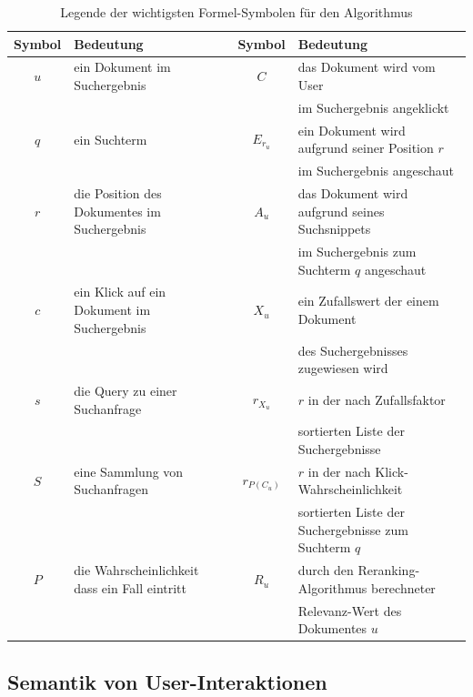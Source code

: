 \begin{table}[H]
\centering
\vspace{-.5em}
\caption[Legende der wichtigsten Formel-Symbolen für den Algorithmus]{Legende der wichtigsten Formel-Symbolen für den Algorithmus}
\label{tab:LegendeSymboleFormelnAlgorithmus}
\vspace{-.5em}
\footnotesize
\renewcommand*{\arraystretch}{1.2}
\begin{tabular}{clcl} \hline
\textbf{Symbol} & \textbf{Bedeutung} & \textbf{Symbol} & \textbf{Bedeutung} \\ \hline
$u$	& ein Dokument im Suchergebnis & $C$	& das Dokument wird vom User \\ &&& im Suchergebnis angeklickt \\ 
$q$	& ein Suchterm & $E_{r_{u}}$	& ein Dokument wird aufgrund seiner Position $r$ \\ &&& im Suchergebnis angeschaut \\
$r$	& die Position des Dokumentes im Suchergebnis &  $A_{u}$	& das Dokument wird aufgrund seines Suchsnippets \\ &&& im Suchergebnis zum Suchterm $q$ angeschaut \\ 
$c$	& ein Klick auf ein Dokument im Suchergebnis & $X_{u}$	& ein Zufallswert der einem Dokument \\ &&& des Suchergebnisses zugewiesen wird \\
$s$ 	& die Query zu einer Suchanfrage & $r_{X_{u}}$	& $r$ in der nach Zufallsfaktor \\ &&& sortierten Liste der Suchergebnisse \\ 
$S$	& eine Sammlung von Suchanfragen & $r_{P(C_{u})}$ 	& $r$ in der nach Klick-Wahrscheinlichkeit \\ &&& sortierten Liste der Suchergebnisse zum Suchterm $q$\\
$P$	& die Wahrscheinlichkeit dass ein Fall eintritt &  $R_{u}$	& durch den Reranking-Algorithmus berechneter \\ &&& Relevanz-Wert des Dokumentes $u$ \\
\hline
\end{tabular}
\vspace{-2em}
\end{table}


\subsection{Semantik von User-Interaktionen}
\label{sec:Grundlagen:Grundbegriffe:SemantikUserInteraktionen}


